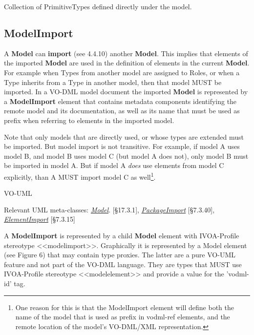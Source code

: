 \documentclass[10pt,a4paper]{ivoa}
\begin{document}
Collection of PrimitiveTypes defined directly under the model.

\hypertarget{modelimport}{%
\subsection{ModelImport}\label{modelimport}}

A \textbf{Model} can \textbf{import} (see 4.4.10) another
\textbf{Model}. This implies that elements of the imported
\textbf{Model} are used in the definition of elements in the current
\textbf{Model}. For example when Types from another model are assigned
to Roles, or when a Type inherits from a Type in another model, then
that model MUST be imported. In a VO-DML model document the imported
\textbf{Model} is represented by a \textbf{ModelImport} element that
contains metadata components identifying the remote model and its
documentation, as well as its name that must be used as prefix when
referring to elements in the imported model.

Note that only models that are directly used, or whose types are
extended must be imported. But model import is not transitive. For
example, if model A uses model B, and model B uses model C (but model A
does not), only model B must be imported in model A. But if model A
\emph{does} use elements from model C explicitly, than A MUST import
model C as well\footnote{One reason for this is that the ModelImport
  element will define both the name of the model that is used as prefix
  in vodml-ref elements, and the remote location of the model's
  VO-DML/XML representation.}.

VO-UML

Relevant UML meta-classes:
\href{http://www.uml-diagrams.org/package-diagrams/model.html}{\emph{Model}}.
{[}§17.3.1{]},
\href{http://www.uml-diagrams.org/package-diagrams.html\#package-import}{\emph{PackageImport}}
{[}§7.3.40{]},
\href{http://www.uml-diagrams.org/package-diagrams.html\#element-import}{\emph{ElementImport}}
{[}§7.3.15{]}

A \textbf{ModelImport} is represented by a child \textbf{Model} element
with IVOA-Profile stereotype
\textless\textless modelimport\textgreater\textgreater. Graphically it
is represented by a Model element (see Figure 6) that may contain type
proxies. The latter are a pure VO-UML feature and not part of the VO-DML
language. They are types that MUST use IVOA-Profile stereotype
\textless\textless modelelement\textgreater\textgreater{} and provide a
value for the 'vodml-id' tag.
\end{document}

